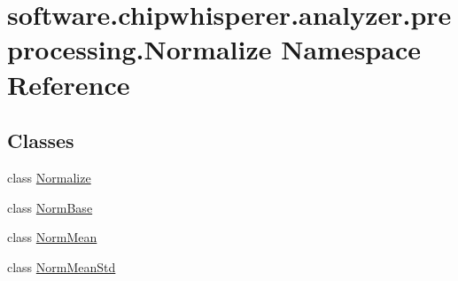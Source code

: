 \hypertarget{namespacesoftware_1_1chipwhisperer_1_1analyzer_1_1preprocessing_1_1Normalize}{}\section{software.\+chipwhisperer.\+analyzer.\+preprocessing.\+Normalize Namespace Reference}
\label{namespacesoftware_1_1chipwhisperer_1_1analyzer_1_1preprocessing_1_1Normalize}
\subsection*{Classes}
\begin{DoxyCompactItemize}
\item 
class \hyperlink{classsoftware_1_1chipwhisperer_1_1analyzer_1_1preprocessing_1_1Normalize_1_1Normalize}{Normalize}
\item 
class \hyperlink{classsoftware_1_1chipwhisperer_1_1analyzer_1_1preprocessing_1_1Normalize_1_1NormBase}{Norm\+Base}
\item 
class \hyperlink{classsoftware_1_1chipwhisperer_1_1analyzer_1_1preprocessing_1_1Normalize_1_1NormMean}{Norm\+Mean}
\item 
class \hyperlink{classsoftware_1_1chipwhisperer_1_1analyzer_1_1preprocessing_1_1Normalize_1_1NormMeanStd}{Norm\+Mean\+Std}
\end{DoxyCompactItemize}
